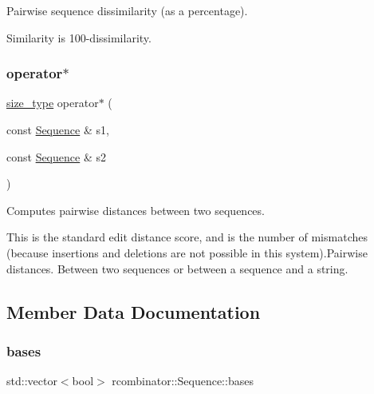 Pairwise sequence dissimilarity (as a percentage). 

Similarity is 100-\/dissimilarity. \mbox{\label{classrcombinator_1_1Sequence_a8cd9dc2cfea97399387e2876ee028c32}} 
\subsubsection{\texorpdfstring{operator$\ast$}{operator*}}
{\footnotesize\ttfamily \mbox{\hyperlink{constants_8h_abcd18a5521fc90ff6e7b00e4fee98397}{size\+\_\+type}} operator$\ast$ (\begin{DoxyParamCaption}\item[{const \mbox{\hyperlink{classrcombinator_1_1Sequence}{Sequence}} \&}]{s1,  }\item[{const \mbox{\hyperlink{classrcombinator_1_1Sequence}{Sequence}} \&}]{s2 }\end{DoxyParamCaption})\hspace{0.3cm}{\ttfamily [friend]}}



Computes pairwise distances between two sequences. 

This is the standard edit distance score, and is the number of mismatches (because insertions and deletions are not possible in this system).Pairwise distances. Between two sequences or between a sequence and a string. 

\subsection{Member Data Documentation}
\mbox{\label{classrcombinator_1_1Sequence_ab37aa0bdc97b3d923407e3a7e17b3209}} 
\subsubsection{\texorpdfstring{bases}{bases}}
{\footnotesize\ttfamily std\+::vector$<$bool$>$ rcombinator\+::\+Sequence\+::bases\hspace{0.3cm}{\ttfamily [private]}}



